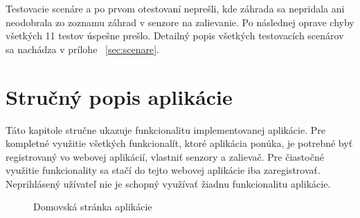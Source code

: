 \documentclass[twoside]{ctuthesis}
\theoremstyle{plain}
\theoremstyle{definition}
\theoremstyle{note}
\begin{document}
Testovacie scenáre \textit {} a \textit {} po prvom otestovaní neprešli, kde záhrada sa nepridala ani neodobrala zo zoznamu záhrad v senzore na zalievanie. Po následnej oprave chyby všetkých 11 testov úspešne prešlo. 
\newline 
\newline 
Detailný popis všetkých testovacích scenárov sa nachádza v prílohe ~\ref{sec:scenare}.


\chapter{Stručný popis aplikácie}
Táto kapitole stručne ukazuje funkcionalitu implementovanej aplikácie. 
\newline
\newline
Pre kompletné využitie všetkých funkcionalít, ktoré aplikácia ponúka, je potrebné byť registrovaný vo webovej aplikácií, vlastniť senzory a zalievač. Pre čiastočné využitie funkcionality sa stačí do tejto webovej aplikácie iba zaregistrovať. Neprihlásený užívateľ nie je schopný využívať žiadnu funkcionalitu aplikácie.
\newpage

\begin{figure}[h]
\caption{Domovská stránka aplikácie}
\label{fig:domov}
\end{figure}
\end{document}
